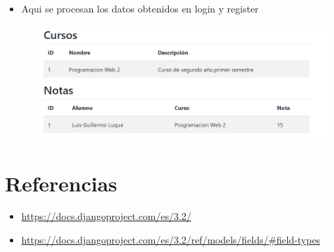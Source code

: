 \documentclass{article}
\begin{document}
	\begin{itemize}
		\item Aqui se procesan los datos obtenidos en login y register
	\end{itemize}	
	
	
	\begin{figure}[H]
		\centering
		\includegraphics[width=1.0\textwidth,keepaspectratio]{img/Vista3.png}
	\end{figure}
\section{Referencias}
\begin{itemize}			
	\item \url{https://docs.djangoproject.com/es/3.2/}
	\item\url{https://docs.djangoproject.com/es/3.2/ref/models/fields/#field-types}
\end{itemize}	
	
%
%
%
			
\end{document}
